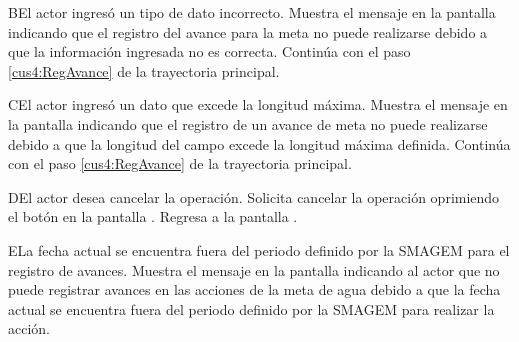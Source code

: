     \begin{UCtrayectoriaA}{B}{El actor ingresó un tipo de dato incorrecto.}    
    \UCpaso[\UCsist] Muestra el mensaje  en la pantalla  indicando que el registro del avance para la meta no puede realizarse debido a que la información ingresada no es correcta.
    \UCpaso[] Continúa con el paso \ref{cus4:RegAvance} de la trayectoria principal.     
    \end{UCtrayectoriaA}
    
    \begin{UCtrayectoriaA}{C}{El actor ingresó un dato que excede la longitud máxima.}    
    \UCpaso[\UCsist] Muestra el mensaje  en la pantalla  indicando que el registro de un avance de meta no puede realizarse debido a que la longitud del campo excede la longitud máxima definida.
    \UCpaso[] Continúa con el paso \ref{cus4:RegAvance} de la trayectoria principal.     
    \end{UCtrayectoriaA}
 
     \begin{UCtrayectoriaA}{D}{El actor desea cancelar la operación.}
      \UCpaso[\UCactor] Solicita cancelar la operación oprimiendo el botón  en la pantalla .
      \UCpaso[\UCsist] Regresa a la pantalla . 
    \end{UCtrayectoriaA}

    \begin{UCtrayectoriaA}{E}{La fecha actual se encuentra fuera del periodo definido por la SMAGEM para el registro de avances.}
    \UCpaso[\UCsist] Muestra el mensaje  en la pantalla  indicando al actor que no puede registrar avances en las acciones de la meta de agua debido a que la fecha actual se encuentra fuera del periodo definido por la SMAGEM para realizar la acción. 
    \end{UCtrayectoriaA}